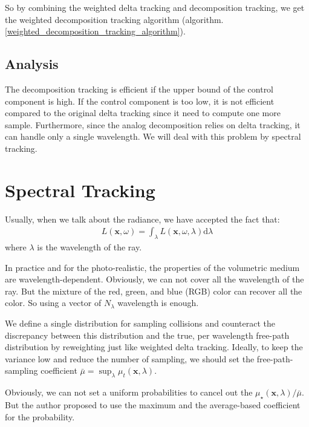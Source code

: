 \documentclass[acmtog]{acmart}
\begin{document}
So by combining the weighted delta tracking and decomposition tracking, we get the weighted decomposition tracking algorithm (algorithm.\ref{weighted_decomposition_tracking_algorithm}).

\subsection{Analysis}
The decomposition tracking is efficient if the upper bound of the control component is high.
If the control component is too low, it is not efficient compared to the original delta tracking since it need to compute one more sample.
Furthermore, since the analog decomposition relies on delta tracking, it can handle only a single wavelength.
We will deal with this problem by spectral tracking.



\section{Spectral Tracking}
Usually, when we talk about the radiance, we have accepted the fact that:
\begin{equation}
	\begin{aligned}
		L(\mathbf x, \omega)=\int_{\lambda}L(\mathbf x, \omega, \lambda)\mathrm d\lambda
	\end{aligned}
\end{equation}
where $\lambda$ is the wavelength of the ray.

In practice and for the photo-realistic, the properties of the volumetric medium are wavelength-dependent.
Obviously, we can not cover all the wavelength of the ray.
But the mixture of the red, green, and blue (RGB) color can recover all the color.
So using a vector of $N_{\lambda}$ wavelength is enough.

We define a single distribution for sampling collisions and counteract the discrepancy between this distribution and the true, per wavelength free-path distribution by reweighting just like weighted delta tracking.
Ideally, to keep the variance low and reduce the number of sampling, we should set the free-path-sampling coefficient $\bar\mu=\sup_{\lambda}\mu_t(\mathbf x, \lambda)$.

Obviously, we can not set a uniform probabilities to cancel out the $\mu_{\star}(\mathbf x, \lambda)/\bar\mu$.
But the author proposed to use the maximum and the average-based coefficient for the probability.
\end{document}
